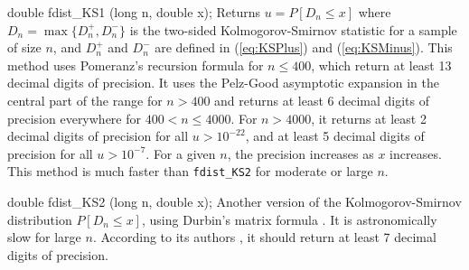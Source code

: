double fdist_KS1 (long n, double x);
\endcode
 \tab Returns $u = P[D_n \le x]$ %
   where $D_n = \max\{D_n^+, D_n^-\}$
  is the two-sided Kolmogorov-Smirnov statistic \cite{tBRO07a} for a sample
  of size $n$, and $D_n^+$ and $D_n^-$ are defined in (\ref{eq:KSPlus}) and
  (\ref{eq:KSMinus}).
 This method uses Pomeranz's recursion formula \cite{tBRO08a,tPOM74a} for
$n \le 400$, which return at least 13 decimal digits of precision. It uses
the Pelz-Good asymptotic expansion \cite{tPEL76a} in the central part of
 the range for $n > 400$ and returns at least 6 decimal digits of precision
 everywhere for $400 < n \le 4000$. For $n > 4000$, it returns at least
 2 decimal digits of precision for all $u > 10^{-22}$, and at least
 5 decimal digits of precision for all $u > 10^{-7}$.
For a given $n$, the precision increases as $x$ increases.
 This method is much faster than  {\tt fdist\_KS2} for moderate or large $n$.
 \endtab
\code


double fdist_KS2 (long n, double x);
\endcode
\tab Another version of the Kolmogorov-Smirnov distribution
$ P[D_n \le x]$, using Durbin's matrix formula \cite{tDUR73a}. 
It is astronomically slow for large $n$. According to its authors 
\cite{tMAR03a}, it should return at least 7 decimal digits
of precision.
\endtab
\code


